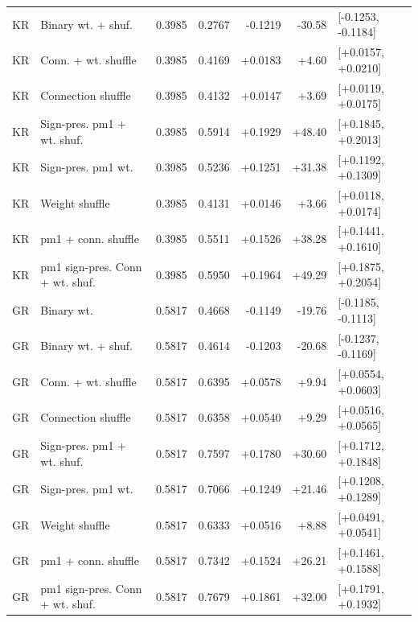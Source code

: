 \begin{tabular}{llrrrrl}
KR & Binary wt. + shuf. & 0.3985 & 0.2767 & -0.1219 & -30.58 & [-0.1253, -0.1184] \\
KR & Conn. + wt. shuffle & 0.3985 & 0.4169 & +0.0183 & +4.60 & [+0.0157, +0.0210] \\
KR & Connection shuffle & 0.3985 & 0.4132 & +0.0147 & +3.69 & [+0.0119, +0.0175] \\
KR & Sign-pres. pm1 + wt. shuf. & 0.3985 & 0.5914 & +0.1929 & +48.40 & [+0.1845, +0.2013] \\
KR & Sign-pres. pm1 wt. & 0.3985 & 0.5236 & +0.1251 & +31.38 & [+0.1192, +0.1309] \\
KR & Weight shuffle & 0.3985 & 0.4131 & +0.0146 & +3.66 & [+0.0118, +0.0174] \\
KR & pm1 + conn. shuffle & 0.3985 & 0.5511 & +0.1526 & +38.28 & [+0.1441, +0.1610] \\
KR & pm1 sign-pres. Conn + wt. shuf. & 0.3985 & 0.5950 & +0.1964 & +49.29 & [+0.1875, +0.2054] \\
GR & Binary wt. & 0.5817 & 0.4668 & -0.1149 & -19.76 & [-0.1185, -0.1113] \\
GR & Binary wt. + shuf. & 0.5817 & 0.4614 & -0.1203 & -20.68 & [-0.1237, -0.1169] \\
GR & Conn. + wt. shuffle & 0.5817 & 0.6395 & +0.0578 & +9.94 & [+0.0554, +0.0603] \\
GR & Connection shuffle & 0.5817 & 0.6358 & +0.0540 & +9.29 & [+0.0516, +0.0565] \\
GR & Sign-pres. pm1 + wt. shuf. & 0.5817 & 0.7597 & +0.1780 & +30.60 & [+0.1712, +0.1848] \\
GR & Sign-pres. pm1 wt. & 0.5817 & 0.7066 & +0.1249 & +21.46 & [+0.1208, +0.1289] \\
GR & Weight shuffle & 0.5817 & 0.6333 & +0.0516 & +8.88 & [+0.0491, +0.0541] \\
GR & pm1 + conn. shuffle & 0.5817 & 0.7342 & +0.1524 & +26.21 & [+0.1461, +0.1588] \\
GR & pm1 sign-pres. Conn + wt. shuf. & 0.5817 & 0.7679 & +0.1861 & +32.00 & [+0.1791, +0.1932] \\
\bottomrule
\end{tabular}

